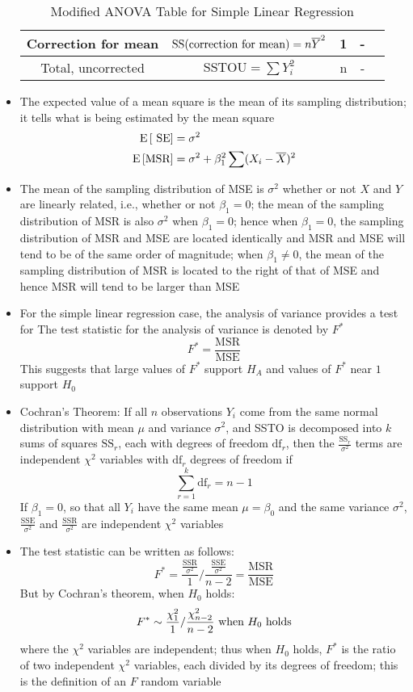 \begin{itemize}
\begin{table}[h!]
\begin{tabular}{|c|c|c|c|c|}
Correction for mean & $\text{SS(correction for mean)} = n\overline{Y}^2$ & 1 & - \\ \hline
Total, uncorrected & $\text{SSTOU} = \sum Y_i^2$ & n & - \\ \hline \end{tabular} \caption*{Modified ANOVA Table for Simple Linear Regression}  \end{table} 
\item The expected value of a mean square is the mean of its sampling distribution; it tells what is being estimated by the mean square $$ \begin{aligned} \mathrm{E}\left[ \text{ SE} \right] &= \sigma^2 \\ \mathrm{E}\left[ \text{MSR} \right] &= \sigma^2 + \beta_1^2\sum (X_i - \overline{X})^2 \end{aligned} $$ 
\item The mean of the sampling distribution of MSE is $\sigma^2$ whether or not $X$ and $Y$ are linearly related, i.e., whether or not $\beta_1 = 0$; the mean of the sampling distribution of MSR is also $\sigma^2$ when $\beta_1=0$; hence when $\beta_1=0$, the sampling distribution of MSR and MSE are located identically and MSR and MSE will tend to be of the same order of magnitude; when $\beta_1 \neq 0$, the mean of the sampling distribution of MSR is located to the right of that of MSE and hence MSR will tend to be larger than MSE
\item For the simple linear regression case, the analysis of variance provides a test for  The test statistic for the analysis of variance is denoted by $F^*$ $$ F^* = \frac{\text{MSR}}{\text{MSE}} $$ This suggests that large values of $F^*$ support $H_A$ and values of $F^*$ near $1$ support $H_0$
\item Cochran's Theorem: If all $n$ observations $Y_i$ come from the same normal distribution with mean $\mu$ and variance $\sigma^2$, and SSTO is decomposed into $k$ sums of squares $\text{SS}_r$, each with degrees of freedom $\text{df}_r$, then the $\frac{\text{SS}_r}{\sigma^2}$ terms are independent $\chi^2$ variables with $\text{df}_r$ degrees of freedom if $$ \sum_{r=1}^k \text{df}_r = n-1 $$ 
If $\beta_1 = 0$, so that all $Y_i$ have the same mean $\mu = \beta_0$ and the same variance $\sigma^2$, $\frac{\text{SSE}}{\sigma^2}$ and $\frac{\text{SSR}}{\sigma^2}$ are independent $\chi^2$ variables 
\item The test statistic can be written as follows: $$ F^* = \frac{\frac{\text{SSR}}{\sigma^2}}{1} / \frac{\frac{\text{SSE}}{\sigma^2}}{n-2} = \frac{\text{MSR}}{\text{MSE}} $$ But by Cochran's theorem, when $H_0$ holds: $$ F^* \sim \frac{\chi^2_{1}}{1} / \frac{\chi^2_{n-2}}{n-2} \text{ when $H_0$ holds} $$ where the $\chi^2$ variables are independent; thus when $H_0$ holds, $F^*$ is the ratio of two independent $\chi^2$ variables, each divided by its degrees of freedom; this is the definition of an $F$ random variable 

\end{itemize}
